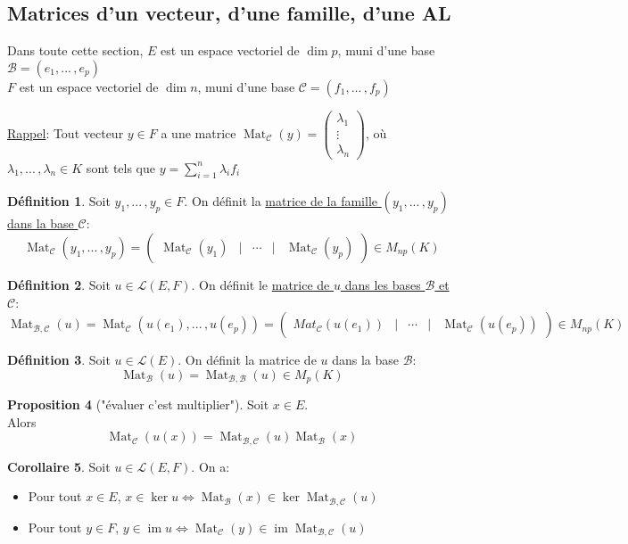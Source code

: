 \documentclass[10pt,a4paper]{article}
\theoremstyle{definition}
\newtheorem{proposition}{Proposition}[section]
\newtheorem{corollaire}[proposition]{Corollaire}
\newtheorem{definition}[proposition]{Définition}
\DeclareMathOperator{\im}{im}
\DeclareMathOperator{\Mat}{Mat}
\begin{document}
\subsection{Matrices d'un vecteur, d'une famille, d'une AL}
Dans toute cette section, $E$ est un espace vectoriel de $\dim p$, muni d'une base $\mathcal{B} = (e_1, ...\, , e_p)$ \\
\hspace*{4.32cm} $F$ est un espace vectoriel de $\dim n$, muni d'une base $\mathcal{C} = (f_1, ...\, , f_p)$

\uline{Rappel}: Tout vecteur $y \in F$ a une matrice $\Mat_\mathcal{C} (y) = \begin{pmatrix}
\lambda_1 \\
\vdots \\
\lambda_n
\end{pmatrix}$, où $\lambda_1, ...\, , \lambda_n \in K$ sont tels que $y = \sum\limits_{i = 1}^{n} \lambda_i f_i$
\begin{definition}
Soit $y_1, ...\, , y_p \in F$. On définit la \uline{matrice de la famille $(y_1, ...\, , y_p)$ dans la base $\mathcal{C}$}:
\[\Mat_\mathcal{C} (y_1, ...\, , y_p) = \begin{pmatrix}
\Mat_\mathcal{C} (y_1) & \Big| & \cdots & \Big| & \Mat_\mathcal{C} (y_p)
\end{pmatrix} \in M_{np} (K)\]
\end{definition}
\begin{definition}
Soit $u \in \mathcal{L}(E, F)$. On définit le \uline{matrice de $u$ dans les bases $\mathcal{B}$ et $\mathcal{C}$}:
\[\Mat_{\mathcal{B}, \mathcal{C}} (u) = \Mat_\mathcal{C} (u(e_1), ...\, , u(e_p)) = \begin{pmatrix}
Mat_\mathcal{C} (u(e_1)) & \Big| & \cdots & \Big| & \Mat_\mathcal{C} (u(e_p))
\end{pmatrix} \in M_{np} (K)\]
\end{definition}
\begin{definition}
Soit $u \in \mathcal{L}(E)$. On définit la matrice de $u$ dans la base $\mathcal{B}$:
\[\Mat_\mathcal{B} (u) = \Mat_{\mathcal{B}, \mathcal{B}} (u) \in M_p (K) \]
\end{definition}
\begin{proposition}["évaluer c'est multiplier"]
Soit $x \in E$. \\
Alors
\[\Mat_\mathcal{C} (u(x)) = \Mat_{\mathcal{B}, \mathcal{C}} (u) \Mat_\mathcal{B} (x)\]
\end{proposition}
\begin{corollaire}
Soit $u \in \mathcal{L}(E, F)$. On a:
\begin{itemize}
\item Pour tout $x \in E$, $x \in \ker u \iff \Mat_\mathcal{B}(x) \in \ker \Mat_{\mathcal{B}, \mathcal{C}}(u)$
\item Pour tout $y \in F$, $y \in \im u \iff \Mat_\mathcal{C}(y) \in \im \Mat_{\mathcal{B}, \mathcal{C}}(u)$
\end{itemize}
\end{corollaire}
\end{document}
